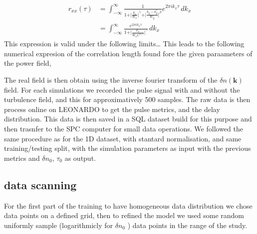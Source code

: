 \documentclass[11pt,a4paper,openany]{report}
\begin{document}
\begin{multicols}{2}
    \begin{align}
        r_{x x}(\tau) & = \int_{-\infty}^{\infty} \frac{1}{1 + \vert \frac{k_x}{W_x} \vert^\gamma + \vert \frac{k_y - k_y^*}{W_y}\vert^\beta} e^{2 \pi i k_x \tau} \, dk_x \\
                      & = \int_{-\infty}^{\infty} \frac{e^{2 \pi i k_x \tau}}{1 + \vert \frac{k_x}{W_x C^{1/ \gamma}} \vert^\gamma} \, dk_x
    \end{align}
    This expression is valid under the following limits\dots
    This leads to the following numerical expresion of the correlation length found fore the given paraameters of the power field,

    The real field is then obtain using the inverse fourier transform of the $\delta n(\textbf{k} )$ field. For each simulations we recorded the pulse signal with and without the turbulence field, and this for approximatively 500 samples. The raw data is then process online on LEONARDO to get the pulse metrics, and the delay distribution. This data is then saved in a SQL dataset build for this purpose and then trasnfer to the SPC computer for small data operations. We followed the same procedure as for the 1D dataset, with stantard normalisation, and same training/testing split, with the simulation parameters as input with the previous metrics and $\delta n_0, \, \tau_0$ as output.

    \subsection{data scanning}
    For the first part of the training to have homogeneous data distribution we chose data points on a defined grid, then to refined the model we used some random uniformly sample (logarithmicly for $\delta n_0$ ) data points in the range of the study.
\end{multicols}
\end{document}
